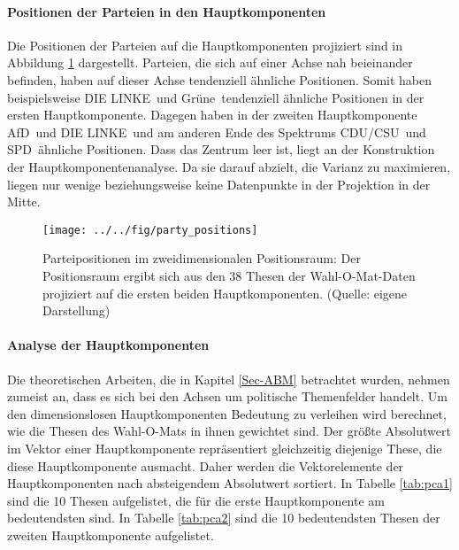 \paragraph{Positionen der Parteien in den Hauptkomponenten}
Die Positionen der Parteien auf die Hauptkomponenten projiziert sind in Abbildung \ref{fig:party-positions-pca} dargestellt. Parteien, die sich auf einer Achse nah beieinander befinden, haben auf dieser Achse tendenziell ähnliche Positionen. Somit haben beispielsweise \glqq DIE LINKE\grqq\ und \glqq Grüne\grqq\ tendenziell ähnliche Positionen in der ersten Hauptkomponente. Dagegen haben in der zweiten Hauptkomponente \glqq AfD\grqq\ und \glqq DIE LINKE\grqq\ und am anderen Ende des Spektrums \glqq CDU/CSU\grqq\ und \glqq SPD\grqq\ ähnliche Positionen. Dass das Zentrum leer ist, liegt an der Konstruktion der Hauptkomponentenanalyse. Da sie darauf abzielt, die Varianz zu maximieren, liegen nur wenige beziehungsweise keine Datenpunkte in der Projektion in der Mitte.

\begin{figure}[htb]
	\centering
	\texttt{[image: ../../fig/party\_positions]}
	\caption{Parteipositionen im zweidimensionalen Positionsraum: Der Positionsraum ergibt sich aus den 38 Thesen der Wahl-O-Mat-Daten \citep{WahlOMat,Bolte2022QualOMat} projiziert auf die ersten beiden Hauptkomponenten. (Quelle: eigene Darstellung)}
	\label{fig:party-positions-pca}
\end{figure}

\paragraph{Analyse der Hauptkomponenten}
Die theoretischen Arbeiten, die in Kapitel \ref{Sec-ABM} betrachtet wurden, nehmen zumeist an, dass es sich bei den Achsen um politische Themenfelder handelt.
Um den dimensionslosen Hauptkomponenten Bedeutung zu verleihen wird berechnet, wie die Thesen des Wahl-O-Mats in ihnen gewichtet sind. Der größte Absolutwert im Vektor einer Hauptkomponente repräsentiert gleichzeitig diejenige These, die diese Hauptkomponente ausmacht. Daher werden die Vektorelemente der Hauptkomponenten nach absteigendem Absolutwert sortiert.
In Tabelle \ref{tab:pca1} sind die 10 Thesen aufgelistet, die für die erste Hauptkomponente am bedeutendsten sind. In Tabelle \ref{tab:pca2} sind die 10 bedeutendsten Thesen der zweiten Hauptkomponente aufgelistet.

